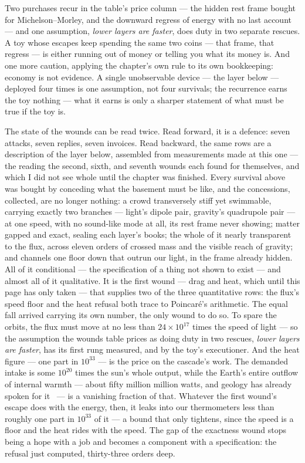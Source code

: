 \documentclass[fontsize=11pt,paper=a4,pagesize=auto,parskip=half-]{scrbook}
\begin{document}
Two purchases recur in the table's price column --- the hidden rest frame bought for Michelson--Morley, and the downward regress of energy with no last account --- and one assumption, \emph{lower layers are faster}, does duty in two separate rescues. A toy whose escapes keep spending the same two coins --- that frame, that regress --- is either running out of money or telling you what its money is. And one more caution, applying the chapter's own rule to its own bookkeeping: economy is not evidence. A single unobservable device --- the layer below --- deployed four times is one assumption, not four survivals; the recurrence earns the toy nothing --- what it earns is only a sharper statement of what must be true if the toy is.

The state of the wounds can be read twice. Read forward, it is a defence: seven attacks, seven replies, seven invoices. Read backward, the same rows are a description of the layer below, assembled from measurements made at this one --- the reading the second, sixth, and seventh wounds each found for themselves, and which I did not see whole until the chapter was finished. Every survival above was bought by conceding what the basement must be like, and the concessions, collected, are no longer nothing: a crowd transversely stiff yet swimmable, carrying exactly two branches --- light's dipole pair, gravity's quadrupole pair --- at one speed, with no sound-like mode at all, its rest frame never showing; matter gapped and exact, sealing each layer's books; the whole of it nearly transparent to the flux, across eleven orders of crossed mass and the visible reach of gravity; and channels one floor down that outrun our light, in the frame already hidden. All of it conditional --- the specification of a thing not shown to exist --- and almost all of it qualitative. It is the first wound --- drag and heat, which until this page has only taken --- that supplies two of the three quantitative rows: the flux's speed floor and the heat refusal both trace to Poincar\'e's arithmetic. The equal fall arrived carrying its own number, the only wound to do so. To spare the orbits, the flux must move at no less than $24\times10^{17}$ times the speed of light --- so the assumption the wounds table prices as doing duty in two rescues, \emph{lower layers are faster}, has its first rung measured, and by the toy's executioner. And the heat figure --- one part in $10^{33}$ --- is the price on the cascade's work. The demanded intake is some $10^{20}$ times the sun's whole output, while the Earth's entire outflow of internal warmth --- about fifty million million watts, and geology has already spoken for it~\cite{daviesdavies2010} --- is a vanishing fraction of that. Whatever the first wound's escape does with the energy, then, it leaks into our thermometers less than roughly one part in $10^{33}$ of it --- a bound that only tightens, since the speed is a floor and the heat rides with the speed. The gap of the exactness wound stops being a hope with a job and becomes a component with a specification: the refusal just computed, thirty-three orders deep.
\end{document}
